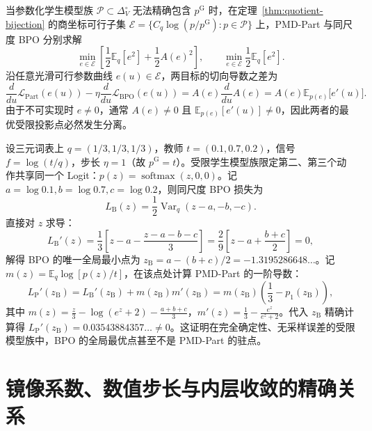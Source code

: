 \documentclass[lang=cn,scheme=chinese,openany]{elegantbook}
\newcommand{\E}{\mathbb E}
\newcommand{\Var}{\operatorname{Var}}
\begin{document}
当参数化学生模型族 $\mathcal P\subset\Delta_V^\circ$ 无法精确包含 $p^{\mathrm G}$ 时，在定理~\ref{thm:quotient-bijection} 的商坐标可行子集 $\mathcal E=\{C_q\log(p/p^{\mathrm G}):p\in\mathcal P\}$ 上，PMD-Part 与同尺度 BPO 分别求解
\begin{equation}
\min_{e\in\mathcal E}\left[\frac12\E_q[e^2]+\frac12 A(e)^2\right],
\qquad \min_{e\in\mathcal E}\frac12\E_q[e^2].
\end{equation}
沿任意光滑可行参数曲线 $e(u)\in\mathcal E$，两目标的切向导数之差为
\begin{equation}
\frac d{du}\mathcal L_{\mathrm{Part}}(e(u))
-\eta\frac d{du}\mathcal L_{\mathrm{BPO}}(e(u))
=A(e)\frac d{du}A(e)
=A(e)\E_{p(e)}\bigl[e'(u)\bigr].
\end{equation}
由于不可实现时 $e\ne 0$，通常 $A(e)\ne 0$ 且 $\E_{p(e)}[e'(u)]\ne 0$，因此两者的最优受限投影点必然发生分离。

\begin{example}
\label{ex:shared-logits-separation}
设三元词表上 $q=(1/3,1/3,1/3)$，教师 $t=(0.1,0.7,0.2)$，信号 $f=\log(t/q)$，步长 $\eta=1$（故 $p^{\mathrm G}=t$）。受限学生模型族限定第二、第三个动作共享同一个 Logit：$p(z)=\operatorname{softmax}(z,0,0)$。记 $a=\log 0.1, b=\log 0.7, c=\log 0.2$，则同尺度 BPO 损失为
\begin{equation}
L_{\mathrm{B}}(z)=\frac12\Var_q(z-a,-b,-c).
\end{equation}
直接对 $z$ 求导：
\begin{equation}
L_{\mathrm{B}}'(z)=\frac13\left[z-a-\frac{z-a-b-c}{3}\right]
=\frac29\left[z-a+\frac{b+c}{2}\right]=0,
\end{equation}
解得 BPO 的唯一全局最小点为 $z_{\mathrm{B}}=a-(b+c)/2=-1.3195286648\ldots$。记 $m(z)=\E_q\log[p(z)/t]$，在该点处计算 PMD-Part 的一阶导数：
\begin{equation}
L_{\mathrm{P}}'(z_{\mathrm{B}})=L_{\mathrm{B}}'(z_{\mathrm{B}})+m(z_{\mathrm{B}})m'(z_{\mathrm{B}})
=m(z_{\mathrm{B}})\left(\frac13-p_1(z_{\mathrm{B}})\right),
\end{equation}
其中 $m(z)=\frac z3-\log(e^z+2)-\frac{a+b+c}{3}$，$m'(z)=\frac13-\frac{e^z}{e^z+2}$。代入 $z_{\mathrm{B}}$ 精确计算得 $L_{\mathrm{P}}'(z_{\mathrm{B}})=0.03543884357\ldots\ne 0$。这证明在完全确定性、无采样误差的受限模型族中，BPO 的全局最优点甚至不是 PMD-Part 的驻点。
\end{example}

\section{镜像系数、数值步长与内层收敛的精确关系}
\label{sec:ch2-eta-step-audit}
\end{document}
